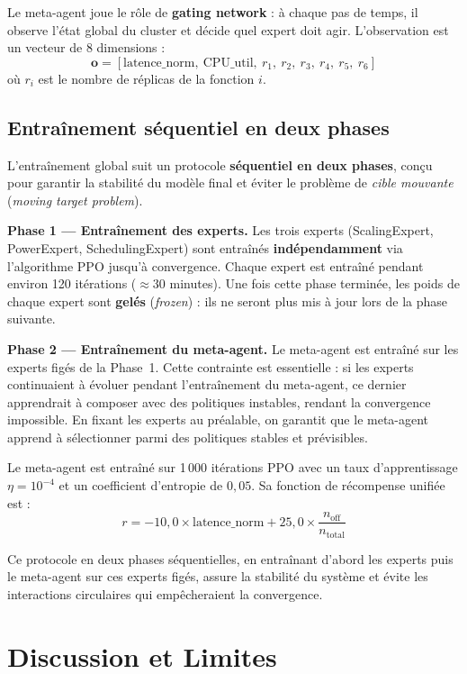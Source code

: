 Le meta-agent joue le rôle de \textbf{gating network} : à chaque pas de
temps, il observe l'état global du cluster et décide quel expert doit agir.
L'observation est un vecteur de 8 dimensions :
\[
\mathbf{o} = [\text{latence\_norm},\ \text{CPU\_util},\ r_1,\ r_2,\ r_3,\ r_4,\ r_5,\ r_6]
\]
où $r_i$ est le nombre de réplicas de la fonction $i$.

\subsection{Entraînement séquentiel en deux phases}

L'entraînement global suit un protocole \textbf{séquentiel en deux phases}, conçu pour garantir la stabilité du modèle final et éviter le problème de \textit{cible mouvante} (\textit{moving target problem}).

\textbf{Phase 1 --- Entraînement des experts.}
Les trois experts (ScalingExpert, PowerExpert, SchedulingExpert) sont entraînés \textbf{indépendamment} via l'algorithme PPO jusqu'à convergence. Chaque expert est entraîné pendant environ 120 itérations ($\approx 30$ minutes). Une fois cette phase terminée, les poids de chaque expert sont \textbf{gelés} (\textit{frozen}) : ils ne seront plus mis à jour lors de la phase suivante.

\textbf{Phase 2 --- Entraînement du meta-agent.}
Le meta-agent est entraîné sur les experts figés de la Phase~1. Cette contrainte est essentielle : si les experts continuaient à évoluer pendant l'entraînement du meta-agent, ce dernier apprendrait à composer avec des politiques instables, rendant la convergence impossible. En fixant les experts au préalable, on garantit que le meta-agent apprend à sélectionner parmi des politiques stables et prévisibles.

Le meta-agent est entraîné sur 1\,000 itérations PPO avec un taux d'apprentissage $\eta = 10^{-4}$ et un coefficient d'entropie de $0{,}05$. Sa fonction de récompense unifiée est :
\[
r = -10{,}0 \times \text{latence\_norm} + 25{,}0 \times \frac{n_{\text{off}}}{n_{\text{total}}}
\]

Ce protocole en deux phases séquentielles, en entraînant d'abord les experts puis le meta-agent sur ces experts figés, assure la stabilité du système et évite les interactions circulaires qui empêcheraient la convergence.

\section{Discussion et Limites}

